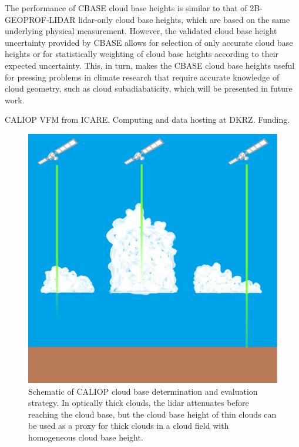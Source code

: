 \documentclass[amt,manuscript]{copernicus}\usepackage[]{graphicx}\usepackage[]{color}
\begin{document}
The performance of CBASE cloud base heights is similar to that of
2B-GEOPROF-LIDAR lidar-only cloud base heights, which are based on the same
underlying physical measurement.  However, the validated cloud base height
uncertainty provided by CBASE allows for selection of only accurate cloud base
heights or for statistically weighting of cloud base heights according to their
expected uncertainty.  This, in turn, makes the CBASE cloud base heights useful
for pressing problems in climate research that require accurate knowledge of
cloud geometry, such as cloud subadiabaticity, which will be presented in future
work. 

\begin{acknowledgements}
CALIOP VFM from ICARE.  Computing and data hosting at DKRZ.  Funding.
\end{acknowledgements}


\begin{figure}
  \centering
  \includegraphics[width=0.5\linewidth,keepaspectratio=true]{CloudFieldCALIOP.pdf}
  \caption{Schematic of CALIOP cloud base determination and evaluation
    strategy.  In optically thick clouds, the lidar attenuates before reaching
    the cloud base, but the cloud base height of thin clouds can be used as a
    proxy for thick clouds in a cloud field with homogeneous cloud base height.}
  \label{fig:method}
\end{figure}
\end{document}
